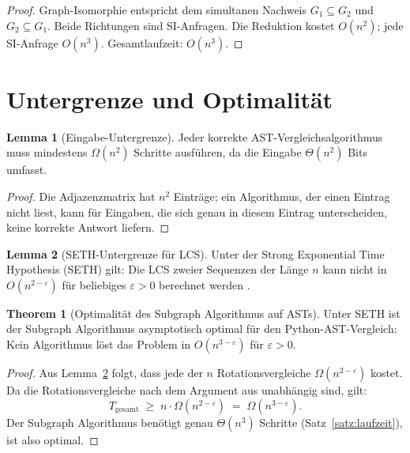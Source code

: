 ﻿\documentclass[a4paper,12pt]{article}
\theoremstyle{definition}
\newtheorem{lemma}{Lemma}
\newtheorem{theorem}{Theorem}
\begin{document}
\begin{proof}
Graph-Isomorphie entspricht dem simultanen Nachweis
$G_1 \subseteq G_2$ und $G_2 \subseteq G_1$.  Beide
Richtungen sind SI-Anfragen.  Die Reduktion kostet
$O(n^2)$; jede SI-Anfrage $O(n^3)$.
Gesamtlaufzeit: $O(n^3)$.
\end{proof}

\section{Untergrenze und Optimalit\"at}

\begin{lemma}[Eingabe-Untergrenze]
\label{lem:eingabe}
Jeder korrekte AST-Vergleichsalgorithmus muss mindestens
$\Omega(n^2)$ Schritte ausf\"uhren, da die Eingabe
$\Theta(n^2)$ Bits umfasst.
\end{lemma}

\begin{proof}
Die Adjazenzmatrix hat $n^2$ Eintr\"age; ein Algorithmus,
der einen Eintrag nicht liest, kann f\"ur Eingaben, die sich
genau in diesem Eintrag unterscheiden, keine korrekte Antwort
liefern.
\end{proof}

\begin{lemma}[SETH-Untergrenze f\"ur LCS]
\label{lem:lcs_seth}
Unter der Strong Exponential Time Hypothesis (SETH) gilt:
Die LCS zweier Sequenzen der L\"ange $n$ kann nicht in
$O(n^{2-\varepsilon})$ f\"ur beliebiges $\varepsilon > 0$
berechnet werden \cite{abboud2015}.
\end{lemma}

\begin{theorem}[Optimalit\"at des Subgraph Algorithmus auf ASTs]
\label{thm:optimal}
Unter SETH ist der Subgraph Algorithmus asymptotisch optimal
f\"ur den Python-AST-Vergleich: Kein Algorithmus l\"ost das
Problem in $O(n^{3-\varepsilon})$ f\"ur $\varepsilon > 0$.
\end{theorem}

\begin{proof}
Aus Lemma~\ref{lem:lcs_seth} folgt, dass jede der $n$
Rotationsvergleiche $\Omega(n^{2-\varepsilon})$ kostet.
Da die Rotationsvergleiche nach dem Argument aus \cite{epp2026}
unabh\"angig sind, gilt:
\[
T_{\text{gesamt}} \;\geq\; n \cdot \Omega(n^{2-\varepsilon})
\;=\; \Omega(n^{3-\varepsilon}).
\]
Der Subgraph Algorithmus ben\"otigt genau $\Theta(n^3)$
Schritte (Satz~\ref{satz:laufzeit}), ist also optimal.
\end{proof}
\end{document}
